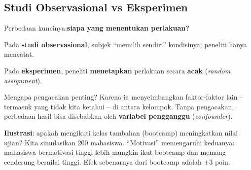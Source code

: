 \documentclass[
  indonesian,
  letterpaper,
]{book}
\begin{document}
\subsection{Studi Observasional vs
Eksperimen}\label{studi-observasional-vs-eksperimen}

Perbedaan kuncinya:\textbf{siapa yang menentukan perlakuan?}

Pada \textbf{studi observasional}, subjek ``memilih sendiri''
kondisinya; peneliti hanya mencatat.

Pada \textbf{eksperimen}, peneliti \textbf{menetapkan} perlakuan secara
\textbf{acak} (\emph{random assignment}).

Mengapa pengacakan penting? Karena ia menyeimbangkan faktor-faktor lain
-- termasuk yang tidak kita ketahui -- di antara kelompok. Tanpa
pengacakan, perbedaan hasil bisa disebabkan oleh \textbf{variabel
pengganggu} (\emph{confounder}).

\textbf{Ilustrasi}: apakah mengikuti kelas tambahan (bootcamp)
meningkatkan nilai ujian? Kita simulasikan 200 mahasiswa. ``Motivasi''
memengaruhi keduanya: mahasiswa bermotivasi tinggi lebih mungkin ikut
bootcamp dan memang cenderung bernilai tinggi. Efek sebenarnya dari
bootcamp adalah +3 poin.
\end{document}
